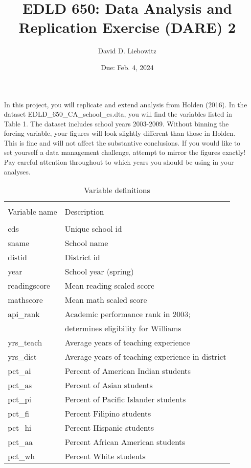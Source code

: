 \documentclass[a4paper, 11pt]{article}
\title{EDLD 650: Data Analysis and Replication Exercise (DARE) 2}
\author{David D. Liebowitz}
\date{Due: Feb. 4, 2024}
\begin{document}
\maketitle

In this project, you will replicate and extend analysis from Holden (2016). In the dataset EDLD\_650\_CA\_school\_es.dta, you will find the variables listed in Table 1. The dataset includes school years 2003-2009. Without binning the forcing variable, your figures will look slightly different than those in Holden. This is fine and will not affect the substantive conclusions. If you would like to set yourself a data management challenge, attempt to mirror the figures exactly! Pay careful attention throughout to which years you should be using in your analyses.

\begin{table}[!htbp] \centering 
  \caption{Variable definitions} 
  \label{} 
\begin{tabular}{ll} 
\\[-1.8ex]\hline 
\\[-1.8ex] Variable name & Description \\ 
\hline \\[-1.8ex]
cds & Unique school id \\
sname & School name \\
distid & District id \\
year & School year (spring) \\
readingscore & Mean reading scaled score \\
mathscore & Mean math scaled score \\
api\_rank & Academic performance rank in 2003;  \\
 & determines eligibility for Williams \\
yrs\_teach & Average years of teaching experience \\
yrs\_dist & Average years of teaching experience in district \\
pct\_ai & Percent of American Indian students \\
pct\_as & Percent of Asian students \\
pct\_pi & Percent of Pacific Islander students \\
pct\_fi & Percent Filipino students  \\
pct\_hi & Percent Hispanic students \\
pct\_aa & Percent African American students \\
pct\_wh & Percent White students \\

\end{tabular}
\end{table}
\end{document}
